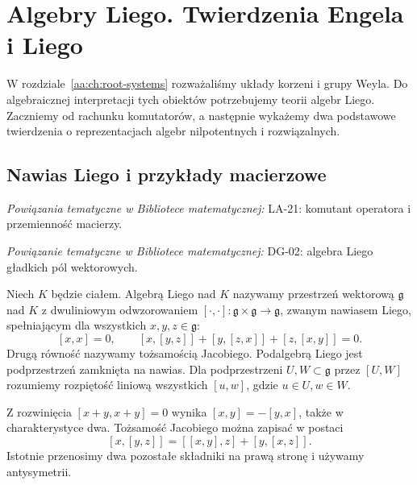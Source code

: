 \chapter{Algebry Liego. Twierdzenia Engela i Liego}
\label{aa:ch:lie-algebras}

\providecommand{\atlasref}[2]{#2}


W rozdziale~\ref{aa:ch:root-systems} rozważaliśmy układy
korzeni i grupy Weyla. Do algebraicznej interpretacji tych
obiektów potrzebujemy teorii algebr Liego. Zaczniemy od
rachunku komutatorów, a następnie wykażemy dwa podstawowe
twierdzenia o reprezentacjach algebr nilpotentnych
i rozwiązalnych.

\section{Nawias Liego i przykłady macierzowe}

\noindent\emph{Powiązania tematyczne w Bibliotece matematycznej:} \atlasref{LA-21::def:lin21-commutant}{LA-21: komutant operatora i przemienność macierzy}.


\noindent\emph{Powiązanie tematyczne w Bibliotece matematycznej:} \atlasref{DG-02::fakt:nawias-wlasnosci}{DG-02: algebra Liego gładkich pól wektorowych}.

\begin{definicja}
\label{aa:def:lie-algebra}
Niech $K$ będzie ciałem. Algebrą Liego nad $K$ nazywamy
przestrzeń wektorową $\mathfrak g$ nad $K$ z dwuliniowym
odwzorowaniem $[\cdot,\cdot]:\mathfrak g\times\mathfrak g
\to\mathfrak g$, zwanym nawiasem Liego, spełniającym
dla wszystkich $x,y,z\in\mathfrak g$:
\[
 [x,x]=0,\qquad
 [x,[y,z]]+[y,[z,x]]+[z,[x,y]]=0.
\]
Drugą równość nazywamy tożsamością Jacobiego.
Podalgebrą Liego jest podprzestrzeń zamknięta
na nawias. Dla podprzestrzeni $U,W\subset\mathfrak g$
przez $[U,W]$ rozumiemy rozpiętość liniową wszystkich
$[u,w]$, gdzie $u\in U,w\in W$.
\end{definicja}

Z rozwinięcia $[x+y,x+y]=0$ wynika
$[x,y]=-[y,x]$, także w charakterystyce dwa.
Tożsamość Jacobiego można zapisać w postaci
\[
 [x,[y,z]]=[[x,y],z]+[y,[x,z]].
\]
Istotnie przenosimy dwa pozostałe składniki
na prawą stronę i używamy antysymetrii.

